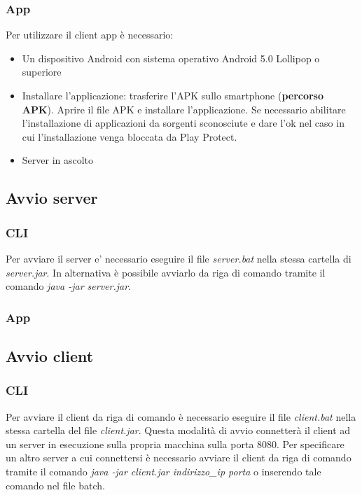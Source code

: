 \subsubsection{App}
\noindent Per utilizzare il client app è necessario:
\begin{itemize}[label=-]
  \item Un dispositivo Android con sistema operativo Android 5.0 Lollipop o superiore
  \item Installare l'applicazione: trasferire l'APK sullo smartphone (\textbf{percorso APK}). Aprire il file APK e installare l'applicazione. Se necessario abilitare l'installazione di applicazioni da sorgenti sconosciute e dare l'ok nel caso in cui l'installazione venga bloccata da Play Protect.
  \item Server in ascolto
\end{itemize}


\subsection{Avvio server}
\subsubsection{CLI}
\noindent Per avviare il server e' necessario eseguire il file \textit{server.bat} nella stessa cartella di \textit{server.jar}. In alternativa è possibile avviarlo da riga di comando tramite il comando \textit{java -jar server.jar}.

\subsubsection{App}
\noindent

\subsection{Avvio client}
\subsubsection{CLI}
\noindent Per avviare il client da riga di comando è necessario eseguire il file \textit{client.bat} nella stessa cartella del file \textit{client.jar}. Questa modalità di avvio connetterà il client ad un server in esecuzione sulla propria macchina sulla porta 8080. Per specificare un altro server a cui connettersi è necessario
avviare il client da riga di comando tramite il comando \textit{java -jar client.jar indirizzo\_ip porta} o inserendo tale comando nel file batch.


